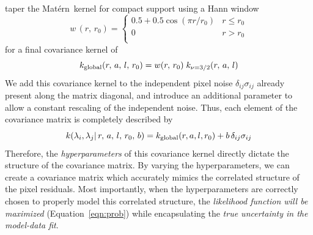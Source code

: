 \documentclass[preprint]{aastex} %
\newcommand{\matern}{Mat\'{e}rn}
\begin{document}
 taper the \matern\ kernel for compact support using a Hann window
\begin{equation}
  w\,(r,\, r_0) = \left \{ 
    \begin{array}{cc}
    0.5 + 0.5 \cos (\pi r/ r_0 ) & r \le r_0 \\
    0 & r > r_0\\
  \end{array}
  \right .
  \label{eqn:Hann}
\end{equation}
for a final covariance kernel of 
\begin{equation}
  k_{\rm global} (r,\, a,\, l,\, r_0) = w(r,\, r_0)\; k_{\nu = 3/2}(r,\, a,\, l) 
  \label{eqn:global}
\end{equation}
We add this covariance kernel to the independent pixel noise $\delta_{ij} \sigma_{ij}$ already present along
 the matrix diagonal, and introduce an additional parameter to allow a constant rescaling of the independent noise. Thus, each element of the covariance matrix is completely described by
\begin{equation}
  k(\lambda_i, \lambda_j |\, r,\, a,\, l,\, r_0,\, b) = k_{\rm global}(r, a, l, r_0) + b\,\delta_{ij} \sigma_{ij}
\end{equation}
Therefore, the \emph{hyperparameters} of this covariance kernel directly dictate the structure of the covariance matrix. By varying the hyperparameters, we can create a covariance matrix which accurately mimics the correlated structure of the pixel residuals. Most importantly, when the hyperparameters are correctly chosen to properly model this correlated structure, the \emph{likelihood function will be maximized} (Equation~\ref{eqn:prob}) while encapsulating the \emph{true uncertainty in the model-data fit}.
 
\end{document}

